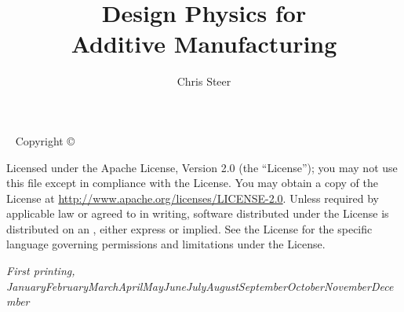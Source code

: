 \documentclass[nols,a4paper,twoside,symmetric,justified,marginals=raggedouter]{tufte-book} %
\title{Design Physics for \\%
 Additive Manufacturing} %
\author[C. A. Steer]{Chris Steer} %
\newcommand{\monthyear}{\ifcase\month\or January\or February\or March\or April\or May\or June\or July\or August\or September\or October\or November\or December\fi\space\number\year} %
\newcommand{\openepigraph}[2]{ %
\begin{fullwidth}
\sffamily\large
\begin{doublespace}
\noindent\allcaps{#1}\\ %
\noindent\allcaps{#2} %
\end{doublespace}
\end{fullwidth}
}
\begin{document}
\frontmatter




\let\allcaps=\relax 
\maketitle %


\newpage
\begin{fullwidth}
~\vfill
\thispagestyle{empty}
\setlength{\parindent}{0pt}
\setlength{\parskip}{\baselineskip}
Copyright \copyright\ \the\year\ \thanklessauthor

\par{}


\par Licensed under the Apache License, Version 2.0 (the ``License''); you may not use this file except in compliance with the License. You may obtain a copy of the License at \url{http://www.apache.org/licenses/LICENSE-2.0}. Unless required by applicable law or agreed to in writing, software distributed under the License is distributed on an , either express or implied. See the License for the specific language governing permissions and limitations under the License.

\par\textit{First printing, \monthyear}
\end{fullwidth}
\end{document}
